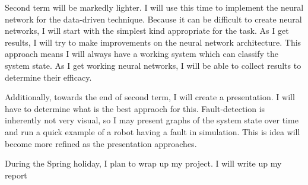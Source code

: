 \documentclass[10pt, a4paper]{article}
\begin{document}
Second term will be markedly lighter. I will use this time to
implement the neural network for the data-driven technique. Because it
can be difficult to create neural networks, I will start with the
simplest kind appropriate for the task. As I get results, I will try
to make improvements on the neural network architecture. This approach
means I will always have a working system which can classify the
system state. As I get working neural networks, I will be able to
collect results to determine their efficacy.

Additionally, towards the end of second term, I will create a
presentation. I will have to determine what is the best appraoch for
this. Fault-detection is inherently not very visual, so I may present
graphs of the system state over time and run a quick example of a
robot having a fault in simulation. This is idea will become more
refined as the presentation approaches.

During the Spring holiday, I plan to wrap up my project. I will write
up my report
\end{document}
